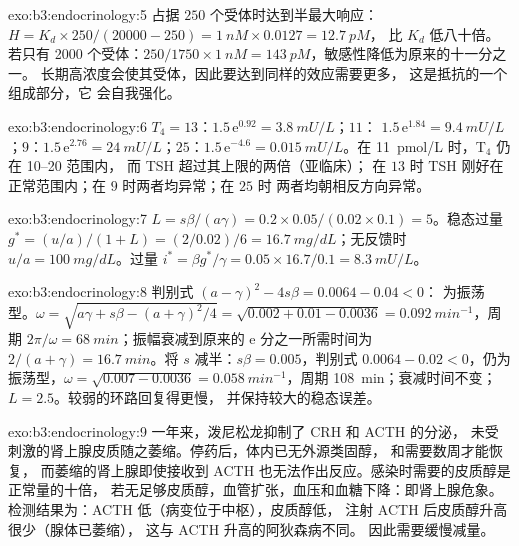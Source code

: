\begin{solution}{exo:b3:endocrinology:5}
占据 $250$ 个受体时达到半最大响应：$H = K_{d}\times
250/(\num{20000} - 250) = \qty{1}{nM}\times 0.0127 = \qty{12.7}{pM}$，
比 $K_{d}$ 低八十倍。若只有 \num{2000} 个受体：$250/1750
\times \qty{1}{nM} = \qty{143}{pM}$，敏感性降低为原来的十一分之一。
长期高浓度会使其受体，因此要达到同样的效应需要更多，
这是抵抗的一个组成部分，它
会自我强化。
\end{solution}

\begin{solution}{exo:b3:endocrinology:6}
$T_{4} = 13$：$1.5\,\mathrm{e}^{0.92} = \qty{3.8}{mU/L}$；$11$：
$1.5\,\mathrm{e}^{1.84} = \qty{9.4}{mU/L}$；$9$：$1.5\,\mathrm{e}^{2.76}
= \qty{24}{mU/L}$；$25$：$1.5\,\mathrm{e}^{-4.6} = \qty{0.015}{mU/L}$。在
\qty{11}{pmol/L} 时，T$_{4}$ 仍在 \qtyrange{10}{20}{} 范围内，
而 TSH 超过其上限的两倍（亚临床）；
在 $13$ 时 TSH 刚好在正常范围内；在 $9$ 时两者均异常；在 $25$ 时
两者均朝相反方向异常。
\end{solution}

\begin{solution}{exo:b3:endocrinology:7}
$L = s\beta/(a\gamma) = 0.2\times 0.05/(0.02\times 0.1) = 5$。稳态过量
$g^{*} = (u/a)/(1 + L) = (2/0.02)/6 = \qty{16.7}{mg/dL}$；无反馈时
$u/a = \qty{100}{mg/dL}$。过量 $i^{*} = \beta g^{*}/
\gamma = 0.05\times 16.7/0.1 = \qty{8.3}{mU/L}$。
\end{solution}

\begin{solution}{exo:b3:endocrinology:8}
判别式 $(a - \gamma)^{2} - 4s\beta = 0.0064 - 0.04 < 0$：
为振荡型。$\omega = \sqrt{a\gamma + s\beta - (a+\gamma)^{2}/4} =
\sqrt{0.002 + 0.01 - 0.0036} = \qty{0.092}{min^{-1}}$，周期 $2\pi/
\omega = \qty{68}{min}$；振幅衰减到原来的 $\mathrm{e}$ 分之一所需时间为 $2/(a +
\gamma) = \qty{16.7}{min}$。将 $s$ 减半：$s\beta = 0.005$，判别式
$0.0064 - 0.02 < 0$，仍为振荡型，$\omega = \sqrt{0.007 - 0.0036}
= \qty{0.058}{min^{-1}}$，周期 \qty{108}{min}；衰减时间不变；
$L = 2.5$。较弱的环路回复得更慢，
并保持较大的稳态误差。
\end{solution}

\begin{solution}{exo:b3:endocrinology:9}
一年来，泼尼松龙抑制了 CRH 和 ACTH 的分泌，
未受刺激的肾上腺皮质随之萎缩。停药后，体内已无外源类固醇，
和需要数周才能恢复，
而萎缩的肾上腺即使接收到 ACTH 也无法作出反应。感染时需要的皮质醇是正常量的十倍，
若无足够皮质醇，血管扩张，血压和血糖下降：即肾上腺危象。
检测结果为：ACTH 低（病变位于中枢），皮质醇低，
注射 ACTH 后皮质醇升高很少（腺体已萎缩），
这与 ACTH 升高的阿狄森病不同。
因此需要缓慢减量。
\end{solution}

